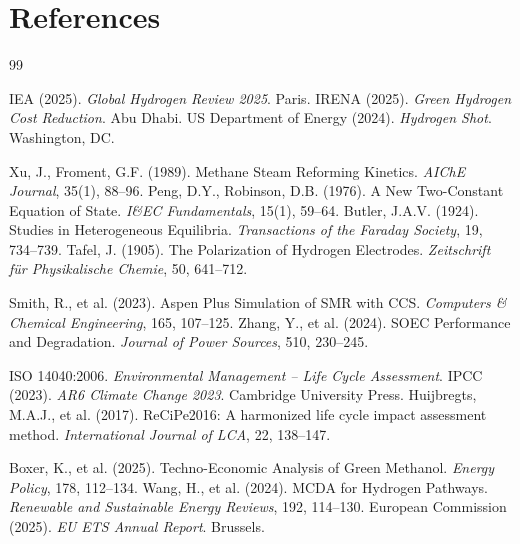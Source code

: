 \documentclass[12pt,twoside,openany]{book}
\begin{document}

\backmatter

\chapter*{References}

\begin{thebibliography}{99}

    IEA (2025). \textit{Global Hydrogen Review 2025}. Paris.
  IRENA (2025). \textit{Green Hydrogen Cost Reduction}. Abu Dhabi.
    US Department of Energy (2024). \textit{Hydrogen Shot}. Washington, DC.

     Xu, J., Froment, G.F. (1989). Methane Steam Reforming Kinetics.
                     \textit{AIChE Journal}, 35(1), 88--96.
   Peng, D.Y., Robinson, D.B. (1976). A New Two-Constant Equation
                     of State. \textit{I\&EC Fundamentals}, 15(1), 59--64.
 Butler, J.A.V. (1924). Studies in Heterogeneous Equilibria.
                     \textit{Transactions of the Faraday Society}, 19, 734--739.
  Tafel, J. (1905). The Polarization of Hydrogen Electrodes.
                     \textit{Zeitschrift f\"ur Physikalische Chemie}, 50, 641--712.

  Smith, R., et al. (2023). Aspen Plus Simulation of SMR with CCS.
                     \textit{Computers \& Chemical Engineering}, 165, 107--125.
  Zhang, Y., et al. (2024). SOEC Performance and Degradation.
                     \textit{Journal of Power Sources}, 510, 230--245.

   ISO 14040:2006. \textit{Environmental Management -- Life Cycle Assessment}.
   IPCC (2023). \textit{AR6 Climate Change 2023}. Cambridge University Press.
 Huijbregts, M.A.J., et al. (2017). ReCiPe2016: A harmonized life cycle
                     impact assessment method. \textit{International Journal of LCA}, 22, 138--147.

  Boxer, K., et al. (2025). Techno-Economic Analysis of Green Methanol.
                     \textit{Energy Policy}, 178, 112--134.
   Wang, H., et al. (2024). MCDA for Hydrogen Pathways.
                     \textit{Renewable and Sustainable Energy Reviews}, 192, 114--130.
  European Commission (2025). \textit{EU ETS Annual Report}. Brussels.


\end{thebibliography}
\end{document}
